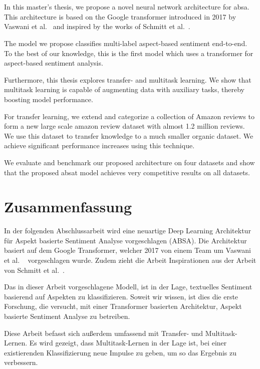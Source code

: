 \chapter{\abstractname}

In this master's thesis, we propose a novel neural network architecture for \acrfull{absa}. This architecture is based on the Google transformer introduced in 2017 by Vaswani et al.~\cite{Vaswani2017} and inspired by the works of Schmitt et al.~\cite{Schmitt2018}.
\medskip

The model we propose classifies multi-label aspect-based sentiment end-to-end. To the best of our knowledge, this is the first model which uses a transformer for aspect-based sentiment analysis.
\medskip

Furthermore, this thesis explores transfer- and multitask learning. We show that multitask learning is capable of augmenting data with auxiliary tasks, thereby boosting model performance. 

For transfer learning, we extend and categorize a collection of Amazon reviews to form a new large scale amazon review dataset with almost 1.2 million reviews. We use this dataset to transfer knowledge to a much smaller organic dataset. We achieve significant performance increases using this technique.
\medskip

We evaluate and benchmark our proposed architecture on four datasets and show that the proposed \acrfull{absat} model achieves very competitive results on all datasets.


\chapter{Zusammenfassung}

In der folgenden Abschlussarbeit wird eine neuartige Deep Learning Architektur für Aspekt basierte Sentiment Analyse vorgeschlagen {(ABSA)}. Die Architektur basiert auf dem Google Transformer, welcher 2017 von einem Team um Vaswani et al. ~\cite{Vaswani2017} vorgeschlagen wurde. Zudem zieht die Arbeit Inspirationen aus der Arbeit von Schmitt et al.~\cite{Schmitt2018}.
\medskip

Das in dieser Arbeit vorgeschlagene Modell, ist in der Lage, textuelles Sentiment basierend auf Aspekten zu klassifizieren. Soweit wir wissen, ist dies die erste Forschung, die versucht, mit einer Transformer basierten Architektur, Aspekt basierte Sentiment Analyse zu betreiben.
\medskip

Diese Arbeit befasst sich außerdem umfassend mit Transfer- und Multitask-Lernen. Es wird gezeigt, dass Multitask-Lernen in der Lage ist, bei einer existierenden Klassifizierung neue Impulse zu geben, um so das Ergebnis zu verbessern. 

